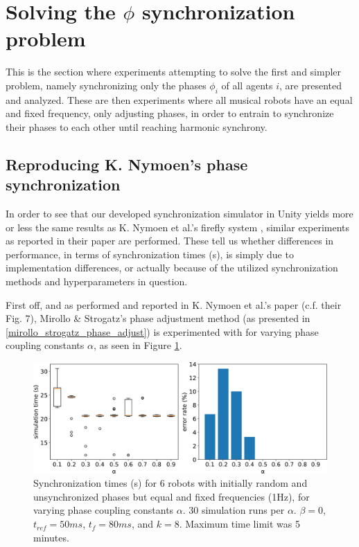 \section{Solving the $\phi$ synchronization problem}
This is the section where experiments attempting to solve the first and simpler problem, namely synchronizing only the phases $\phi_i$ of all agents $i$, are presented and analyzed. These are then experiments where all musical robots have an equal and fixed frequency, only adjusting phases, in order to entrain to synchronize their phases to each other until reaching harmonic synchrony.
	
	\subsection{Reproducing K. Nymoen's phase synchronization}
	
	In order to see that our developed synchronization simulator in Unity yields more or less the same results as K. Nymoen et al.'s firefly system \cite{nymoen_synch}, similar experiments as reported in their paper are performed. These tell us whether differences in performance, in terms of synchronization times (s), is simply due to implementation differences, or actually because of the utilized synchronization methods and hyperparameters in question. 
	
	First off, and as performed and reported in K. Nymoen et al.'s paper \cite{nymoen_synch} (c.f. their Fig. 7), Mirollo \& Strogatz's phase adjustment method (as presented in \ref{mirollo_strogatz_phase_adjust}) is experimented with for varying phase coupling constants $\alpha$, as seen in Figure \ref{fig:exp1}.
	
	\begin{figure}[ht!]
		\centering
		\includegraphics[width=\linewidth]{Assets/DocSegments/Chapters/ExperimentsAndResults/Figures/PerfScores/experiment1_perfScores.pdf}
		\caption{Synchronization times (s) for 6 robots with initially random and unsynchronized phases but equal and fixed frequencies (1Hz), for varying phase coupling constants $\alpha$. 30 simulation runs per $\alpha$. $\beta=0$, $t_{ref}=50ms$, $t_f=80ms$, and $k=8$. Maximum time limit was 5 minutes.}
		\label{fig:exp1}
	\end{figure}
	
